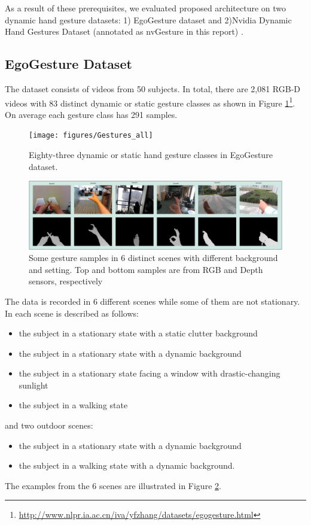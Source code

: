 As a result of these prerequisites,  we evaluated proposed architecture on two dynamic hand gesture datasets:   1) EgoGesture dataset \cite{zhang_egogesture:_2018} and 2)Nvidia Dynamic Hand Gestures  Dataset  (annotated as nvGesture in this report)  \cite{nvidia_online_nodate}. \\

\subsection{EgoGesture Dataset}
\label{subsec:egogesture}
The dataset consists of videos from 50 subjects.  In total,  there are 2,081 RGB-D videos with 83 distinct dynamic or static gesture classes as shown in Figure  \ref{fig:egogesturesall}\cite{cao_egocentric_2017,zhang_egogesture:_2018}\footnote{\url{http://www.nlpr.ia.ac.cn/iva/yfzhang/datasets/egogesture.html}}.  On average each gesture class has 291 samples.\\
\begin{figure}[H]
	\centering
	\texttt{[image: figures/Gestures\_all]}
	\caption{Eighty-three dynamic or static hand gesture classes in EgoGesture dataset.}
	\label{fig:egogesturesall}
\end{figure}

\begin{figure}[h]
	\centering
	\includegraphics[width=1\linewidth]{figures/Scenes}
	\caption{Some gesture samples in 6 distinct scenes with different background and setting. Top and bottom samples are from RGB and Depth sensors, respectively} 
	\label{fig:scenes}
\end{figure}
The data is recorded in 6 different scenes while some of them are not stationary.  In \cite{zhang_egogesture:_2018,cao_egocentric_2017} each scene is described  as follows:
\begin{itemize}
\item the subject in a stationary state with a static clutter background
\item the subject in a stationary state with a dynamic background
\item the subject in a stationary state facing a window with drastic-changing sunlight
\item the subject in a walking state
\end{itemize}
and two outdoor scenes:
\begin{itemize}
\item the subject in a stationary state with a dynamic background
\item the subject in a walking state with a dynamic background.
\end{itemize}
The examples from the 6 scenes are illustrated in Figure \ref{fig:scenes}. 

